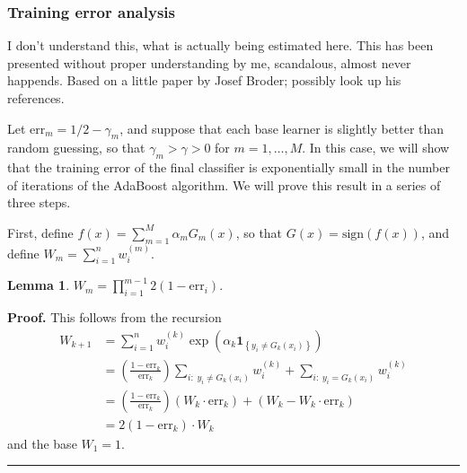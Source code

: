 \documentclass[11pt,twoside]{article}%
\theoremstyle{change}
\newtheorem{lemma}[theorem]{Lemma}
\newenvironment{proof}[1][Proof]{\textbf{#1.} }{\ \rule{0.5em}{0.5em}}
\newenvironment{quote-env}{\begin{quote}\sffamily }{\end{quote}}
\newenvironment{mycomments-env}[1][Mycomments]{\textbf{#1.} \begin{quote-env} }{ \end{quote-env}  \ \rule{0.5em}{0.5em}}
\begin{document}
\subsubsection{ Training error analysis}%

\begin{mycomments}%


\begin{mycomments-env}
I don't understand this, what is actually being estimated here. This has been
presented without proper understanding by me, scandalous, almost never
happends. Based on a little paper by Josef Broder; possibly look up his references.
\end{mycomments-env}%

\end{mycomments}%


Let $\mathrm{err}_{m}=1/2-\gamma_{m}$, and suppose that each base learner is
slightly better than random guessing, so that $\gamma_{m}>\gamma>0$ for
$m=1,\ldots,M$. In this case, we will show that the training error of the
final classifier is exponentially small in the number of iterations of the
AdaBoost algorithm. We will prove this result in a series of three steps.

First, define $f(x)=\sum_{m=1}^{M}\alpha_{m}G_{m}(x)$, so that
$G(x)=\mathrm{sign}\left(  f(x)\right)  $, and define $W_{m}=\sum_{i=1}%
^{n}w_{i}^{(m)}$.

\begin{lemma}
$W_{m}=%
{\displaystyle\prod\limits_{i=1}^{m-1}}
2\left(  1-\mathrm{err}_{i}\right)  .$
\end{lemma}

\begin{proof}
This follows from the recursion%
\begin{align*}
W_{k+1}  & =\sum_{i=1}^{n}w_{i}^{(k)}\exp\left(  \alpha_{k}\mathbf{1}%
_{\left\{  y_{i}\neq G_{k}(x_{i})\right\}  }\right) \\
& =\left(  \frac{1-\mathrm{err}_{k}}{\mathrm{err}_{k}}\right)  \sum
_{i:\;y_{i}\neq G_{k}(x_{i})}w_{i}^{(k)}+\sum_{i:\;y_{i}=G_{k}(x_{i})}%
w_{i}^{(k)}\\
& =\left(  \frac{1-\mathrm{err}_{k}}{\mathrm{err}_{k}}\right)  \left(
W_{k}\cdot\mathrm{err}_{k}\right)  +\left(  W_{k}-W_{k}\cdot\mathrm{err}%
_{k}\right) \\
& =2\left(  1-\mathrm{err}_{k}\right)  \cdot W_{k}%
\end{align*}
and the base $W_{1}=1$.
\end{proof}
\end{document}
